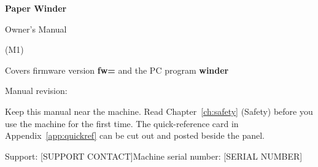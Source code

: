 \begin{titlepage}
\thispagestyle{empty}
\centering
\vspace*{1.2in}
{\Huge\bfseries Paper Winder\par}
\vspace{0.4em}
{\LARGE Owner's Manual\par}
\vspace{1.5em}
{\Large \machine{} (M1)\par}
\vspace{2.5em}
\par\vspace{2.5em}
{\large Covers firmware version \textbf{fw=\fwver} and the PC program \textbf{winder}\par}
\vspace{0.5em}
{\large Manual revision: \textbf{\revdate}\par}
\vfill
\begin{minipage}{0.85\textwidth}
\small
Keep this manual near the machine. Read Chapter~\ref{ch:safety} (Safety)
before you use the machine for the first time. The quick-reference card in
Appendix~\ref{app:quickref} can be cut out and posted beside the panel.

Support: [SUPPORT CONTACT]\quad Machine serial number: [SERIAL NUMBER]
\end{minipage}
\end{titlepage}
